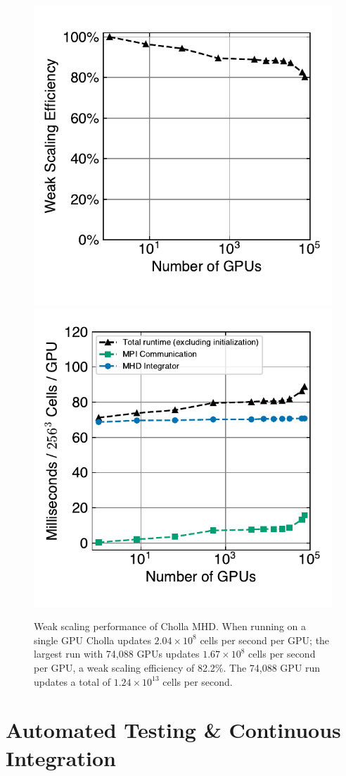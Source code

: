 \documentclass[modern, linenumbers]{aastex631}
\newcommand*{\img}[1]{%
    \raisebox{-.3\baselineskip}{%
        \texttt{[image: \#1]}%
    }%
}
\begin{document}

\begin{figure}[ht!]
    \includegraphics[width=0.5\linewidth]{scaling_tests_weak_efficiency.pdf}
    \includegraphics[width=0.5\linewidth]{scaling_tests_ms_per_gpu.pdf}
    \caption{Weak scaling performance of Cholla MHD. When running on a single GPU Cholla updates $2.04\times10^8$ cells per second per GPU; the largest run with 74,088 GPUs updates $1.67\times10^8$ cells per second per GPU, a weak scaling efficiency of 82.2\%. The 74,088 GPU run updates a total of $1.24\times10^{13}$ cells per second. \href{https://github.com/bcaddy/caddy-et-al-2023/blob/4612068c56b05fbb3286bb96228c65862a6e3c10/python/scaling_plots.py}{\img{github.png}}}
    \label{fig:scaling-weak-efficiency}
\end{figure}

\section{Automated Testing \& Continuous Integration}
\label{sec:testing}
\end{document}
